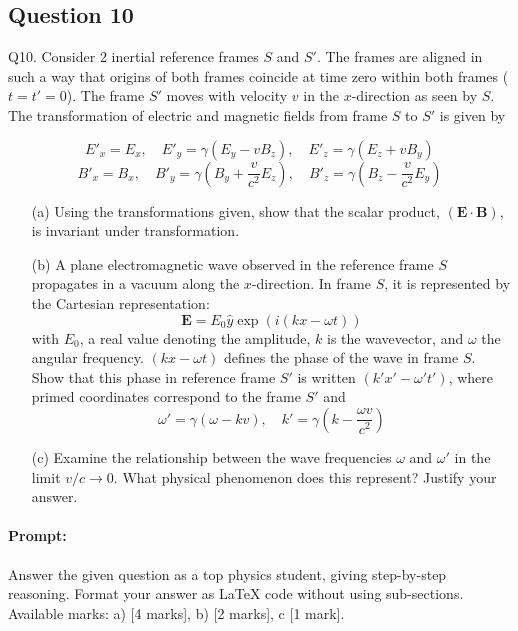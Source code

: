 \documentclass{article}
\begin{document}
\subsection{Question 10}
Q10. Consider 2 inertial reference frames \( S \) and \( S' \). The frames are aligned in such a way that origins of both frames coincide at time zero within both frames (\( t = t' = 0 \)). The frame \( S' \) moves with velocity \( v \) in the \( x \)-direction as seen by \( S \). The transformation of electric and magnetic fields from frame \( S \) to \( S' \) is given by 

\[
E'_x = E_x, \quad E'_y = \gamma (E_y - v B_z), \quad E'_z = \gamma (E_z + v B_y)
\]
\[
B'_x = B_x, \quad B'_y = \gamma \left( B_y + \frac{v}{c^2} E_z \right), \quad B'_z = \gamma \left( B_z - \frac{v}{c^2} E_y \right)
\]

\begin{enumerate}
    \item[(a)] Using the transformations given, show that the scalar product, \( (\mathbf{E} \cdot \mathbf{B}) \), is invariant under transformation.
    
    \item[(b)] A plane electromagnetic wave observed in the reference frame \( S \) propagates in a vacuum along the \( x \)-direction. In frame \( S \), it is represented by the Cartesian representation:
    \[
    \mathbf{E} = E_0 \hat{y} \exp \left( i (k x - \omega t) \right)
    \]
    with \( E_0 \), a real value denoting the amplitude, \( k \) is the wavevector, and \( \omega \) the angular frequency. \( (kx - \omega t) \) defines the phase of the wave in frame \( S \). Show that this phase in reference frame \( S' \) is written \( (k' x' - \omega' t') \), where primed coordinates correspond to the frame \( S' \) and 
    \[
    \omega' = \gamma (\omega - k v), \quad k' = \gamma \left( k - \frac{\omega v}{c^2} \right)
    \]

    \item[(c)] Examine the relationship between the wave frequencies \( \omega \) and \( \omega' \) in the limit \( v / c \to 0 \). What physical phenomenon does this represent? Justify your answer.
\end{enumerate}


\paragraph{Prompt: \\} 
Answer the given question as a top physics student, giving step-by-step reasoning. Format your answer as LaTeX code without using sub-sections. Available marks: a) [4 marks], b) [2 marks], c [1 mark].
\end{document}
